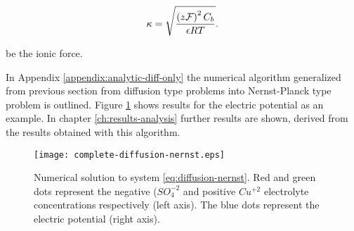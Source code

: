 \begin{align}
	\label{eq:ionic-force}
	\kappa = \sqrt{\frac{\left({z\mathcal{F}}\right)^2C_b}{\epsilon RT}}.
\end{align}

be the ionic force.

In Appendix \ref{appendix:analytic-diff-only} the numerical algorithm generalized from previous section from diffusion type problems into Nernst-Planck type problem is outlined. Figure \ref{fig:nernst-planck} shows results for the electric potential as an example. In chapter \ref{ch:results-analysis} further results are shown, derived from the results obtained with this algorithm.

\begin{figure}[htbp]
\centering
\texttt{[image: complete-diffusion-nernst.eps]}
\caption{Numerical solution to system \ref{eq:diffusion-nernst}. Red and green dots represent the negative ($SO_4^{-2}$ and positive $Cu^{+2}$ electrolyte concentrations respectively (left axis). The blue dots represent the electric potential (right axis).}
\label{fig:nernst-planck}
\end{figure}









